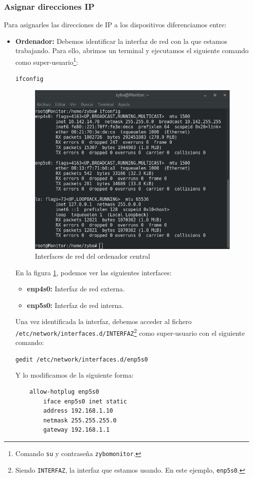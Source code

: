 \subsubsection{Asignar direcciones IP}
Para asignarles las direcciones de IP a los dispositivos diferenciamos entre:
\begin{itemize}
	\item \textbf{Ordenador:} Debemos identificar la interfaz de red con la que estamos trabajando. Para ello, abrimos un terminal y ejecutamos el siguiente comando como super-usuario\footnote{Comando \texttt{su} y contraseña \texttt{zybomonitor}.}:
	\begin{center}
		\texttt{ifconfig}
	\end{center}
	\newpage
	\begin{figure}[h]
		\centering
		\includegraphics[scale=0.5]{Anexos/Anexo2/Infraestructura/ifconfigPC.png}
		\caption{Interfaces de red del ordenador central}
		\label{Interfaces de red del ordenador central}
	\end{figure}
	
	En la figura \ref{Interfaces de red del ordenador central}, podemos ver las siguientes interfaces:
	\begin{itemize}
		\item \textbf{enp4s0:} Interfaz de red externa.
		\item \textbf{enp5s0:} Interfaz de red interna.
	\end{itemize}
	
	Una vez identificada la interfaz, debemos acceder al fichero\\ \texttt{/etc/network/interfaces.d/INTERFAZ}\footnote{Siendo \texttt{INTERFAZ}, la interfaz que estamos usando. En este ejemplo, \texttt{enp5s0}.} como super-usuario con el siguiente comando:
	\begin{center}
		\texttt{gedit /etc/network/interfaces.d/enp5s0}
	\end{center}
	Y lo modificamos de la siguiente forma:
	\begin{lstlisting}
	allow-hotplug enp5s0
	    iface enp5s0 inet static
	    address 192.168.1.10
	    netmask 255.255.255.0
	    gateway 192.168.1.1
	\end{lstlisting}
	

\end{itemize}
